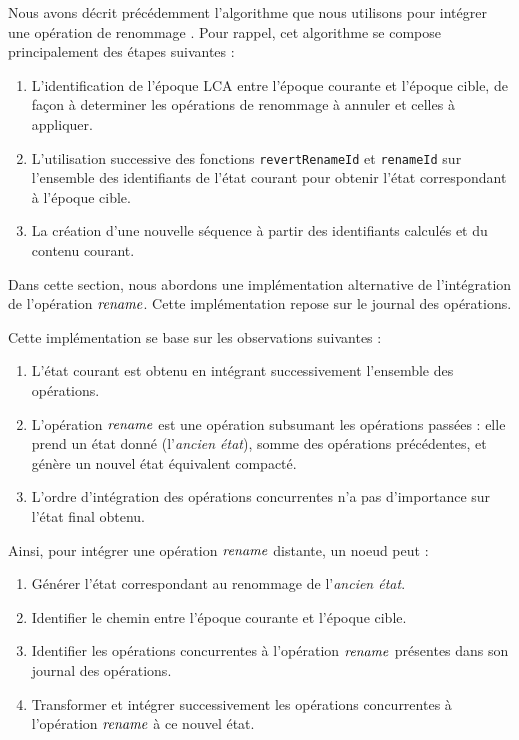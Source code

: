 Nous avons décrit précédemment l'algorithme que nous utilisons pour intégrer une opération de renommage .
Pour rappel, cet algorithme se compose principalement des étapes suivantes :
\begin{enumerate}
  \item L'identification de l'époque \ac{LCA} entre l'époque courante et l'époque cible, de façon à determiner les opérations de renommage à annuler et celles à appliquer.
  \item L'utilisation successive des fonctions \texttt{revertRenameId} et \texttt{renameId} sur l'ensemble des identifiants de l'état courant pour obtenir l'état correspondant à l'époque cible.
  \item La création d'une nouvelle séquence à partir des identifiants calculés et du contenu courant.
\end{enumerate}

Dans cette section, nous abordons une implémentation alternative de l'intégration de l'opération $\mathit{rename}$.
Cette implémentation repose sur le journal des opérations.

Cette implémentation se base sur les observations suivantes :
\begin{enumerate}
  \item L'état courant est obtenu en intégrant successivement l'ensemble des opérations.
  \item L'opération $\mathit{rename}$ est une opération subsumant les opérations passées : elle prend un état donné (l'\emph{ancien état}), somme des opérations précédentes, et génère un nouvel état équivalent compacté.
  \item L'ordre d'intégration des opérations concurrentes n'a pas d'importance sur l'état final obtenu.
\end{enumerate}

Ainsi, pour intégrer une opération $\mathit{rename}$ distante, un noeud peut :
\begin{enumerate}
  \item Générer l'état correspondant au renommage de l'\emph{ancien état}.
  \item Identifier le chemin entre l'époque courante et l'époque cible.
  \item Identifier les opérations concurrentes à l'opération $\mathit{rename}$ présentes dans son journal des opérations.
  \item Transformer et intégrer successivement les opérations concurrentes à l'opération $\mathit{rename}$ à ce nouvel état.
\end{enumerate}

